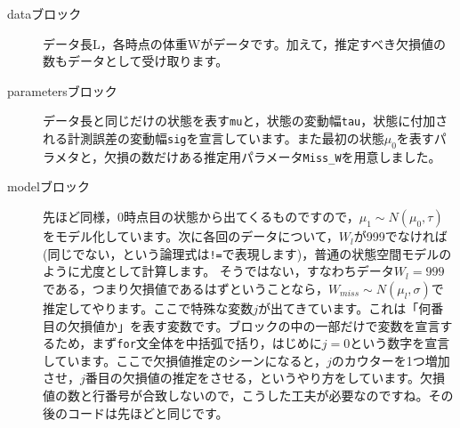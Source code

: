 \begin{description}
	\item[dataブロック] データ長L，各時点の体重Wがデータです。加えて，推定すべき欠損値の数もデータとして受け取ります。
	\item[parametersブロック] データ長と同じだけの状態を表す\verb|mu|と，状態の変動幅\verb|tau|，状態に付加される計測誤差の変動幅\verb|sig|を宣言しています。また最初の状態$\mu_0$を表すパラメタと，欠損の数だけある推定用パラメータ\verb|Miss_W|を用意しました。
	\item[modelブロック] 先ほど同様，0時点目の状態から出てくるものですので，$\mu_1 \sim N(\mu_0,\tau)$をモデル化しています。次に各回のデータについて，$W_l$が999でなければ(同じでない，という論理式は\verb|!=|で表現します)，普通の状態空間モデルのように尤度として計算します。 そうではない，すなわちデータ$W_l=999$である，つまり欠損値であるはずということなら，$W_{miss} \sim N(\mu_l,\sigma)$で推定してやります。ここで特殊な変数$j$が出てきています。これは「何番目の欠損値か」を表す変数です。ブロックの中の一部だけで変数を宣言するため，まず\verb|for|文全体を中括弧で括り，はじめに$j=0$という数字を宣言しています。ここで欠損値推定のシーンになると，$j$のカウターを1つ増加させ，$j$番目の欠損値の推定をさせる，というやり方をしています。欠損値の数と行番号が合致しないので，こうした工夫が必要なのですね。その後のコードは先ほどと同じです。
\end{description}
